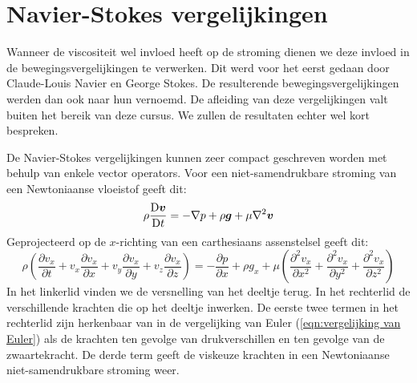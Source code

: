 	\section{Navier-Stokes vergelijkingen}
Wanneer de viscositeit wel invloed heeft op de stroming dienen we deze invloed in de bewegingsvergelijkingen te verwerken. Dit werd voor het eerst gedaan door  Claude-Louis Navier en  George Stokes. De resulterende bewegingsvergelijkingen werden dan ook naar hun vernoemd. De afleiding van deze vergelijkingen valt buiten het bereik van deze cursus. We zullen de resultaten echter wel kort bespreken.

De Navier-Stokes vergelijkingen kunnen zeer compact geschreven worden met behulp van enkele vector operators. Voor een niet-samendrukbare stroming van een Newtoniaanse vloeistof geeft dit:
\begin{equation}
	\rho \frac{\mathrm{D} \boldsymbol{v}}{\mathrm{D} t} = -\nabla p + \rho \boldsymbol{g} + \mu \nabla^2 \boldsymbol{v}
	\label{eqn:navier-stokes vergelijkingen}
\end{equation}
Geprojecteerd op de $x$-richting van een carthesiaans assenstelsel geeft dit:
\begin{equation}
	\rho \left(\frac{\partial v_x}{\partial t} + v_x \frac{\partial v_x}{\partial x} + v_y \frac{\partial v_x}{\partial y} + v_z \frac{\partial v_x}{\partial z} \right) = -\frac{\partial p}{\partial x} +\rho g_x + \mu \left( \frac{\partial^2 v_x}{\partial x^2} + \frac{\partial^2 v_x}{\partial y^2} + \frac{\partial^2 v_x}{\partial z^2} \right)
	\label{eqn:navier-stokes vergelijkingen carthesiaans}
\end{equation}
In het linkerlid vinden we de versnelling van het deeltje terug. In het rechterlid de verschillende krachten die op het deeltje inwerken. De eerste twee termen in het rechterlid zijn herkenbaar van in de vergelijking van Euler (\ref{eqn:vergelijking van Euler}) als de krachten ten gevolge van drukverschillen en ten gevolge van de zwaartekracht. De derde term geeft de viskeuze krachten in een Newtoniaanse niet-samendrukbare stroming weer.
	